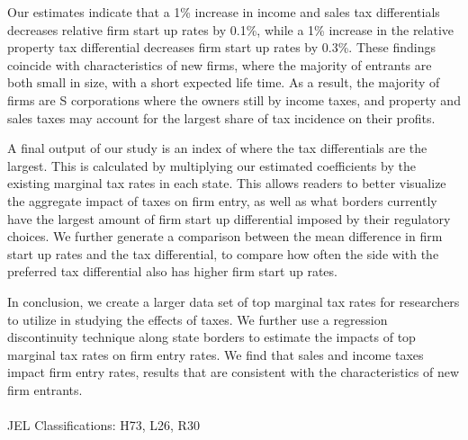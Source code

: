 \documentclass[12 pt,a4paper]{article} %
\begin{document}
Our estimates indicate that a 1\% increase in income and sales tax differentials decreases relative firm start up rates by 0.1\%, while a 1\% increase in the relative property tax differential decreases firm start up rates by 0.3\%. These findings coincide with characteristics of new firms, where the majority of entrants are both small in size, with a short expected life time. As a result, the majority of firms are S corporations where the owners still by income taxes, and property and sales taxes may account for the largest share of tax incidence on their profits.

A final output of our study is an index of where the tax differentials are the largest. This is calculated by multiplying our estimated coefficients by the existing marginal tax rates in each state. This allows readers to better visualize the aggregate impact of taxes on firm entry, as well as what borders currently have the largest amount of firm start up differential imposed by their regulatory choices. We further generate a comparison between the mean difference in firm start up rates and the tax differential, to compare how often the side with the preferred tax differential also has higher firm start up rates.

In conclusion, we create a larger data set of top marginal tax rates for researchers to utilize in studying the effects of taxes. We further use a regression discontinuity technique along state borders to estimate the impacts of top marginal tax rates on firm entry rates. We find that sales and income taxes impact firm entry rates, results that are consistent with the characteristics of new firm entrants.
\\
\\
JEL Classifications: H73, L26, R30
\end{document}
